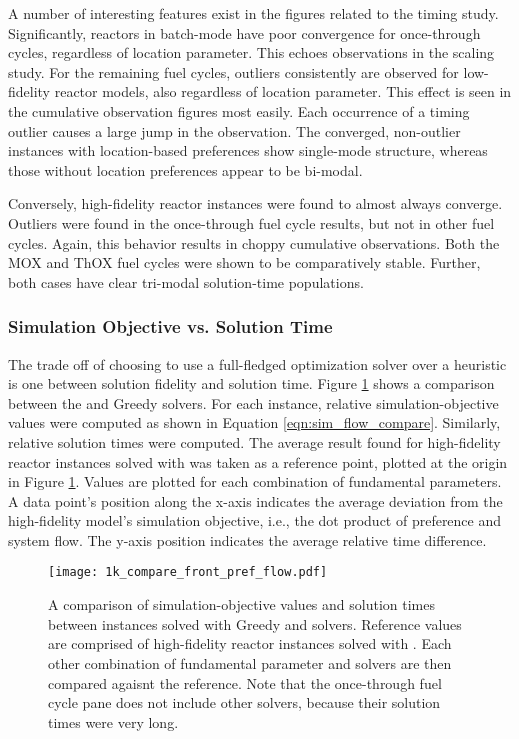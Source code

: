 A number of interesting features exist in the figures related to the \cbc timing
study. Significantly, reactors in batch-mode have poor convergence for
once-through cycles, regardless of location parameter. This echoes observations
in the scaling study. For the remaining fuel cycles, outliers consistently are
observed for low-fidelity reactor models, also regardless of location
parameter. This effect is seen in the cumulative observation figures most
easily. Each occurrence of a timing outlier causes a large jump in the
observation. The converged, non-outlier instances with location-based
preferences show single-mode structure, whereas those without location
preferences appear to be bi-modal.

Conversely, high-fidelity reactor instances were found to almost always
converge. Outliers were found in the once-through fuel cycle results, but not in
other fuel cycles. Again, this behavior results in choppy cumulative
observations. Both the MOX and ThOX fuel cycles were shown to be comparatively
stable. Further, both cases have clear tri-modal solution-time populations.

\subsubsection{Simulation Objective vs. Solution Time}

The trade off of choosing to use a full-fledged optimization solver over a
heuristic is one between solution fidelity and solution time. Figure
\ref{fig:1k_compare_front_pref_flow} shows a comparison between the \cbc and
Greedy solvers. For each instance, relative simulation-objective values were
computed as shown in Equation \ref{eqn:sim_flow_compare}. Similarly, relative
solution times were computed. The average result found for high-fidelity reactor
instances solved with \cbc was taken as a reference point, plotted at the origin
in Figure \ref{fig:1k_compare_front_pref_flow}. Values are plotted for each
combination of fundamental parameters. A data point's position along the x-axis
indicates the average deviation from the high-fidelity model's simulation
objective, i.e., the dot product of preference and system flow. The y-axis
position indicates the average relative time difference.

\begin{figure}[h!]
  \begin{center}
    \texttt{[image: 1k\_compare\_front\_pref\_flow.pdf]}
    \caption{
      \label{fig:1k_compare_front_pref_flow}
      A comparison of simulation-objective values and solution times between
      instances solved with Greedy and \cbc solvers. Reference values are
      comprised of high-fidelity reactor instances solved with \cbc. Each other
      combination of fundamental parameter and solvers are then compared agaisnt
      the reference. Note that the once-through fuel cycle pane does not include
      other \cbc solvers, because their solution times were very long.
    }
  \end{center}
\end{figure}

